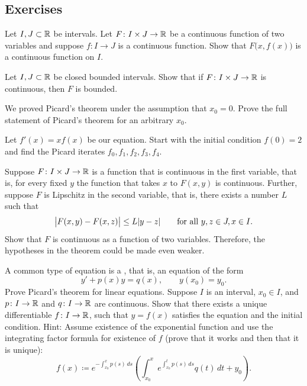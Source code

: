 \subsection{Exercises}

\begin{exercise}
Let $I, J \subset {\mathbb{R}}$ be intervals.
Let $F \colon I \times J \to {\mathbb{R}}$ be a continuous function
of two variables
and suppose $f \colon I \to J$ is a continuous function.
Show that $F\bigl(x,f(x)\bigr)$ is a continuous function on $I$.
\end{exercise}

\begin{exercise}
Let $I, J \subset {\mathbb{R}}$ be closed bounded intervals.
Show that if $F \colon I \times J \to {\mathbb{R}}$ is continuous,
then $F$ is bounded.
\end{exercise}

\begin{exercise}
We proved Picard's theorem under the assumption that $x_0 = 0$.
Prove the full statement of Picard's theorem for an arbitrary $x_0$.
\end{exercise}

\begin{exercise}
Let $f'(x)=x f(x)$ be our equation.  Start with the initial condition
$f(0)=2$ and find the Picard iterates $f_0,f_1,f_2,f_3,f_4$.
\end{exercise}

\begin{exercise}
Suppose $F \colon I \times J \to {\mathbb{R}}$
is a function that is continuous in the first variable,
that is, for every fixed $y$ the function that takes $x$ to $F(x,y)$ is
continuous.  Further, suppose $F$ is Lipschitz in the second variable,
that is, there exists a number $L$ such that
\begin{equation*}
\bigl\lvert {F(x,y) - F(x,z)} \bigr\rvert \leq L \lvert {y-z} \rvert
\qquad \text{for all } y,z \in J, x \in I .
\end{equation*}
Show that $F$ is continuous as a function of two variables.  Therefore, the
hypotheses in the theorem could be made even weaker.
\end{exercise}

\begin{exercise}
\pagebreak[2]
A common type of equation is a
\emph{}, that is,
an equation of the form
\begin{equation*}
y' + p(x) y = q(x) , \qquad y(x_0) = y_0 .
\end{equation*}
Prove Picard's theorem for linear equations.  Suppose $I$ is an
interval, $x_0 \in I$, and $p \colon I \to {\mathbb{R}}$ and $q \colon I \to {\mathbb{R}}$ are
continuous.
Show that there exists a unique differentiable $f \colon I \to {\mathbb{R}}$,
such that $y = f(x)$
satisfies the equation and the initial condition.
Hint: Assume existence of the exponential function and use the integrating
factor formula for existence of $f$ (prove that it works and then that it is unique):
\begin{equation*}
f(x) \coloneqq e^{-\int_{x_0}^x p(s)\, ds} \left( \int_{x_0}^x e^{\int_{x_0}^t p(s)\, ds}
q(t) \,dt + y_0 \right).
\end{equation*}
\end{exercise}

